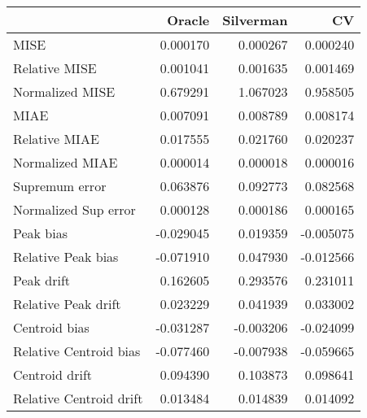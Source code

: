 \begin{tabular}{lrrr}
  \toprule
 & Oracle & Silverman & CV \\ 
  \midrule
MISE & 0.000170 & 0.000267 & 0.000240 \\ 
  Relative MISE & 0.001041 & 0.001635 & 0.001469 \\ 
  Normalized MISE & 0.679291 & 1.067023 & 0.958505 \\ 
  MIAE & 0.007091 & 0.008789 & 0.008174 \\ 
  Relative MIAE & 0.017555 & 0.021760 & 0.020237 \\ 
  Normalized MIAE & 0.000014 & 0.000018 & 0.000016 \\ 
  Supremum error & 0.063876 & 0.092773 & 0.082568 \\ 
  Normalized Sup error & 0.000128 & 0.000186 & 0.000165 \\ 
  Peak bias & -0.029045 & 0.019359 & -0.005075 \\ 
  Relative Peak bias & -0.071910 & 0.047930 & -0.012566 \\ 
  Peak drift & 0.162605 & 0.293576 & 0.231011 \\ 
  Relative Peak drift & 0.023229 & 0.041939 & 0.033002 \\ 
  Centroid bias & -0.031287 & -0.003206 & -0.024099 \\ 
  Relative Centroid bias & -0.077460 & -0.007938 & -0.059665 \\ 
  Centroid drift & 0.094390 & 0.103873 & 0.098641 \\ 
  Relative Centroid drift & 0.013484 & 0.014839 & 0.014092 \\ 
   \bottomrule
\end{tabular}
